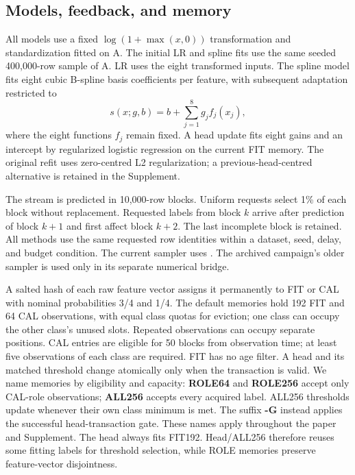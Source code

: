 \subsection{Models, feedback, and memory}
All models use a fixed $\log(1+\max(x,0))$ transformation and standardization fitted on A. The initial LR and spline fits use the same seeded 400,000-row sample of A. LR uses the eight transformed inputs. The spline model fits eight cubic B-spline basis coefficients per feature, with subsequent adaptation restricted to
\begin{equation}
 s(x;g,b)=b+\sum_{j=1}^{8}g_j f_j(x_j),
\end{equation}
where the eight functions $f_j$ remain fixed. A head update fits eight gains and an intercept by regularized logistic regression on the current FIT memory. The original refit uses zero-centred L2 regularization; a previous-head-centred alternative is retained in the Supplement.

The stream is predicted in 10,000-row blocks. Uniform requests select 1\% of each block without replacement. Requested labels from block $k$ arrive after prediction of block $k+1$ and first affect block $k+2$. The last incomplete block is retained. All methods use the same requested row identities within a dataset, seed, delay, and budget condition. The current sampler uses . The archived campaign's older sampler is used only in its separate numerical bridge.

A salted hash of each raw feature vector assigns it permanently to FIT or CAL with nominal probabilities 3/4 and 1/4. The default memories hold 192 FIT and 64 CAL observations, with equal class quotas for eviction; one class can occupy the other class's unused slots. Repeated observations can occupy separate positions. CAL entries are eligible for 50 blocks from observation time; at least five observations of each class are required. FIT has no age filter. A head and its matched threshold change atomically only when the transaction is valid. We name memories by eligibility and capacity: \textbf{ROLE64} and \textbf{ROLE256} accept only CAL-role observations; \textbf{ALL256} accepts every acquired label. ALL256 thresholds update whenever their own class minimum is met. The suffix \textbf{-G} instead applies the successful head-transaction gate. These names apply throughout the paper and Supplement. The head always fits FIT192. Head/ALL256 therefore reuses some fitting labels for threshold selection, while ROLE memories preserve feature-vector disjointness.

